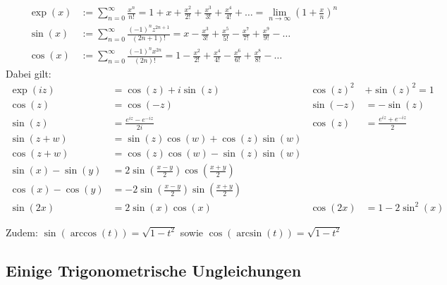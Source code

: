 \documentclass[25pt]{sciposter}
\begin{document}
\begin{multicols}{3}
\begin{align*}
	\operatorname{exp}(x) &:=\sum_{n=0}^{\infty} \frac{x^n}{n!} = 1 + x + \frac{x^2}{2!} + \frac{x^3}{3!} + \frac{x^4}{4!} +  \ldots = \lim_{n \to \infty} \left( 1 + \frac xn \right)^n\\
	\operatorname{sin}(x) &:=\sum_{n=0}^{\infty} \frac{(-1)^n z^{2n+1}}{(2n+1)!} = x - \frac{x^3}{3!}+ \frac{x^5}{5!} - \frac{x^7}{7!} +  \frac{x^9}{9!} - \ldots\\
	\operatorname{cos}(x) &:=\sum_{n=0}^{\infty} \frac{(-1)^n x^{2n}}{(2n)!} = 1 - \frac{x^2}{2!} + \frac{x^4}{4!} -\frac{x^6}{6!} + \frac{x^8}{8!} -\ldots 
\end{align*}
Dabei gilt:
\begin{align*}
\operatorname{exp}(iz) &= \cos (z) + i\sin(z) &  \cos(z) ^2 &+ \sin(z)^2 = 1\\
\cos(z) &= \cos(-z) & \sin (-z) &= - \sin(z) \\
\sin (z) &= \frac{e^{iz} - e^{-iz}}{2i} & \cos (z) &= \frac{e^{iz} + e^{-iz}}{2}\\
\sin(z+w) &= \sin(z) \cos(w) + \cos(z) \sin(w) \\
\cos(z + w) &= \cos(z) \cos(w) - \sin(z) \sin(w)\\
\sin(x) - \sin(y) &=  2 \sin \left(\frac{x-y}{2}\right) \cos \left(\frac{x+y}{2}\right)\\
\cos(x) - \cos(y) &= - 2 \sin \left(\frac{x-y}{2}\right) \sin \left(\frac{x+y}{2}\right)\\
\sin(2x) &= 2\sin(x)\cos(x) &  \cos(2x) &= 1 - 2\sin^2(x)
\end{align*}

Zudem: $\sin(\arccos(t)) = \sqrt{1 - t^2}$ sowie $\cos(\arcsin(t)) = \sqrt{1-t^2}$



\subsection*{Einige Trigonometrische Ungleichungen}


\end{multicols}
\end{document}
